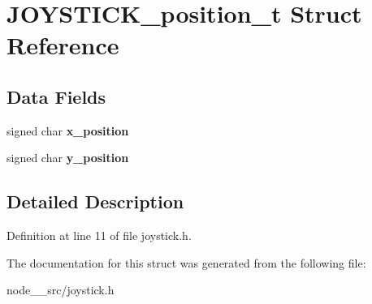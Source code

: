 \hypertarget{structJOYSTICK__position__t}{}\section{J\+O\+Y\+S\+T\+I\+C\+K\+\_\+position\+\_\+t Struct Reference}
\label{structJOYSTICK__position__t}
\subsection*{Data Fields}
\begin{DoxyCompactItemize}
\item 
signed char {\bfseries x\+\_\+position}\hypertarget{structJOYSTICK__position__t_a7c2d190d7ea7783f037ace5bc5114619}{}\label{structJOYSTICK__position__t_a7c2d190d7ea7783f037ace5bc5114619}

\item 
signed char {\bfseries y\+\_\+position}\hypertarget{structJOYSTICK__position__t_adc1c57b3bb1b05fb93395b9f38bd2917}{}\label{structJOYSTICK__position__t_adc1c57b3bb1b05fb93395b9f38bd2917}

\end{DoxyCompactItemize}


\subsection{Detailed Description}


Definition at line 11 of file joystick.\+h.



The documentation for this struct was generated from the following file\+:\begin{DoxyCompactItemize}
\item 
node\+\_\+\_\+src/joystick.\+h\end{DoxyCompactItemize}
